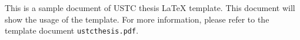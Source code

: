 ﻿
\begin{abstract}
本文档是中国科学技术大学学位论文 \LaTeX{} 模板的一个示例文档. 这里会给出模板使用方法的简介. 模板选项及详细用法请参考说明文档 \verb|ustcthesis.pdf|.


\end{abstract}

\begin{enabstract}

This is a sample document of USTC thesis \LaTeX{} template. This document will show the usage of the template. For more information, please refer to the template document \verb|ustcthesis.pdf|.


\end{enabstract}
